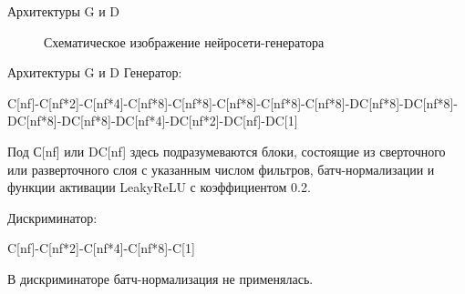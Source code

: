 \documentclass[12pt]{beamer}
\begin{document}
	\begin{frame}{Архитектуры G и D}
		\begin{figure}[h!]
			\vfill
			Схематическое изображение нейросети-генератора
		\end{figure}
	\end{frame}
	
	\begin{frame}{Архитектуры G и D}
		Генератор:
		
		C[nf]-C[nf*2]-C[nf*4]-C[nf*8]-C[nf*8]-C[nf*8]-C[nf*8]-C[nf*8]-DC[nf*8]-DC[nf*8]-DC[nf*8]-DC[nf*8]-DC[nf*4]-DC[nf*2]-DC[nf]-DC[1]
		
		Под С[nf] или DC[nf] здесь подразумеваются блоки, состоящие из сверточного или разверточного слоя с указанным числом фильтров, батч-нормализации и функции активации LeakyReLU с коэффициентом 0.2.
		
		Дискриминатор:
		
		C[nf]-C[nf*2]-C[nf*4]-C[nf*8]-C[1]
		
		В дискриминаторе батч-нормализация не применялась.
	\end{frame}
\end{document}
